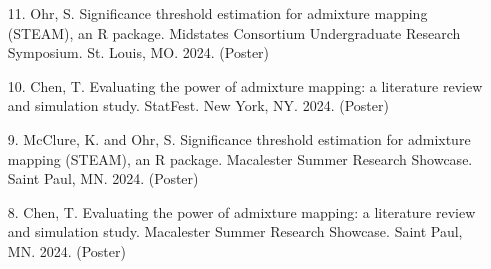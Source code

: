 \documentclass[margin]{res}
\begin{document}
\begin{resume}
\begin{itemize}

\item[11.] Ohr, S. Significance threshold estimation for admixture mapping (STEAM), an R package. Midstates Consortium Undergraduate Research Symposium. St. Louis, MO. 2024. (Poster)

\item[10.] Chen, T. Evaluating the power of admixture mapping: a literature review and simulation study. StatFest. New York, NY. 2024. (Poster) 

\item[9.] McClure, K. and Ohr, S. Significance threshold estimation for admixture mapping (STEAM), an R package. Macalester Summer Research Showcase. Saint Paul, MN. 2024. (Poster)

\item[8.] Chen, T. Evaluating the power of admixture mapping: a literature review and simulation study. Macalester Summer Research Showcase. Saint Paul, MN. 2024. (Poster)




\end{itemize}
\end{resume}
\end{document}
